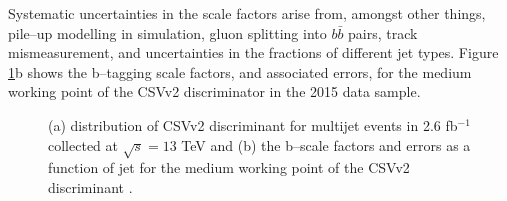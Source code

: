 Systematic uncertainties in the scale factors arise from, amongst other things,
pile--up modelling in simulation, gluon splitting into $b\bar{b}$ pairs, track mismeasurement,
and uncertainties in the fractions of different jet types.
Figure \ref{fig:objects_bjets}b shows the b--tagging scale factors, and associated errors,
for the medium working point of the \ac{CSV}v2 discriminator in the
2015 data sample.

\begin{figure}
\begin{center}
\end{center}
\caption{(a) distribution of CSVv2 discriminant for multijet events in 2.6 fb$^{-1}$ 
collected at $\sqrt{s} = 13$ TeV and (b) the b--scale factors and errors
as a function of jet \pT for the medium working point of the CSVv2 discriminant \cite{cms-btag-run2}.}
\label{fig:objects_bjets}
\end{figure}





